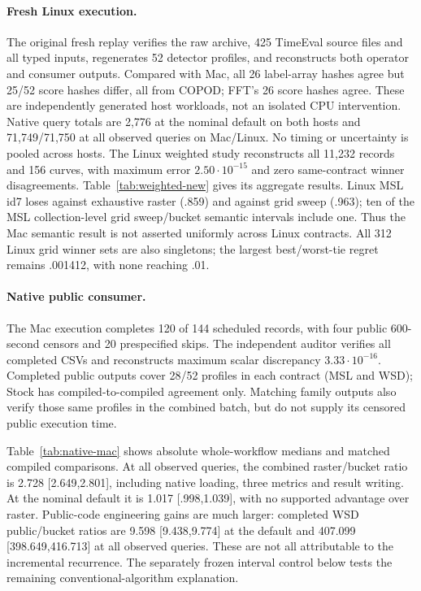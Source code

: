 \paragraph{Fresh Linux execution.}
The original fresh replay verifies the raw archive,
425 TimeEval source files and all typed inputs, regenerates 52 detector
profiles, and reconstructs both operator and consumer outputs. Compared with
Mac, all 26 label-array hashes agree but 25/52 score hashes differ, all from
COPOD; FFT's 26 score hashes agree. These are independently generated host
workloads, not an isolated CPU intervention. Native query totals are 2,776
at the nominal default on both hosts and 71,749/71,750 at all observed queries
on Mac/Linux. No timing or uncertainty is pooled across hosts.
The Linux weighted study reconstructs all 11,232 records and 156 curves,
with maximum error $2.50\cdot10^{-15}$ and zero same-contract winner
disagreements. Table~\ref{tab:weighted-new} gives its aggregate results.
Linux MSL id7 loses against exhaustive raster (.859) and against grid sweep
(.963); ten of the MSL collection-level grid sweep/bucket semantic intervals
include one. Thus the Mac semantic result is not asserted uniformly across
Linux contracts. All 312 Linux grid winner sets are also singletons; the
largest best/worst-tie regret remains .001412, with none reaching .01.

\paragraph{Native public consumer.}
The Mac execution completes 120 of 144 scheduled records, with four public
600-second censors and 20 prespecified skips. The independent auditor verifies
all completed CSVs and reconstructs maximum scalar discrepancy
$3.33\cdot10^{-16}$. Completed public outputs cover 28/52 profiles in each
contract (MSL and WSD); Stock has compiled-to-compiled agreement only. Matching
family outputs also verify those same profiles in the combined batch, but do
not supply its censored public execution time.

Table~\ref{tab:native-mac} shows absolute whole-workflow medians and matched
compiled comparisons. At all observed queries, the combined raster/bucket
ratio is 2.728 [2.649,2.801], including native loading, three metrics and result
writing. At the nominal default it is 1.017 [.998,1.039], with no supported
advantage over raster. Public-code engineering gains are much larger: completed
WSD public/bucket ratios are 9.598 [9.438,9.774] at the default and
407.099 [398.649,416.713] at all observed queries. These are not all attributable
to the incremental recurrence. The separately frozen interval control below
tests the remaining conventional-algorithm explanation.

